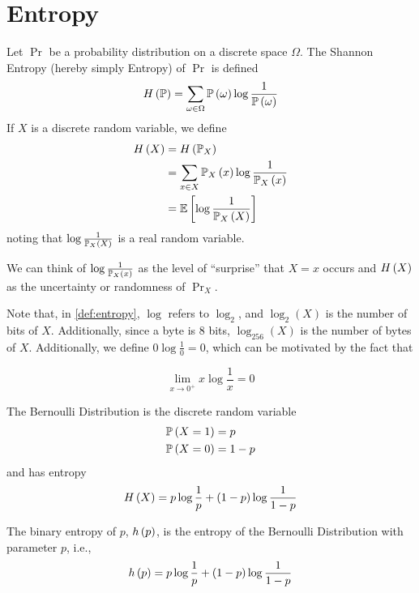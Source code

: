 \section{Entropy}

\begin{definition}[Entropy]
    \label{def:entropy}
    Let $\Pr$ be a probability distribution on a discrete space $\Omega$. The
    Shannon Entropy (hereby simply Entropy) of $\Pr$ is defined
    \[\entropy{\Pr} = \sum_{\omega \in \Omega}\prob{\omega}\log\frac{1}{\prob{\omega}}\]
    If $X$ is a discrete random variable, we define
    \begin{align*}\entropy{X}
         & = \entropy{\Pr_X}                                    \\
         & = \sum_{x \in X}\prob[X]{x}\log\frac{1}{\prob[X]{x}} \\
         & = \expectation{\log\frac{1}{\prob[X]{X}}}
    \end{align*}
    noting that $\log\frac{1}{\prob[X]{X}}$ is a real random variable.
\end{definition}

We can think of $\log\frac{1}{\prob[X]{x}}$ as the level of ``surprise'' that
$X = x$ occurs and $H\left(X\right)$ as the uncertainty or randomness of $\Pr_X$.

Note that, in \cref{def:entropy}, $\log$ refers to $\log_2$, and $\log_2(X)$ is
the number of bits of $X$. Additionally, since a byte is 8 bits, $\log_{256}(X)$
is the number of bytes of $X$. Additionally, we define $0\log\frac{1}{0} = 0$,
which can be motivated by the fact that

\[\lim_{x\to0^+}x\log\frac{1}{x} = 0\]

\begin{example}
    The Bernoulli Distribution is the discrete random variable
    \begin{align*}
        \prob{X = 1} & = p     \\
        \prob{X = 0} & = 1 - p
    \end{align*}
    and has entropy
    \[H\left(X\right) = p\log\frac{1}{p} + (1 - p)\log\frac{1}{1 - p}\]
\end{example}

\begin{definition}
    The binary entropy of $p$, $h\left(p\right)$, is the entropy of the Bernoulli Distribution with
    parameter $p$, i.e.,
    \[h\left(p\right) = p\log\frac{1}{p} + (1 - p)\log\frac{1}{1 - p}\]
\end{definition}

